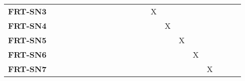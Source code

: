 \documentclass[12pt, titlepage]{article}
\begin{document}
\begin{landscape}
\begin{longtable}{|l|cccccccccccccccc|}
		\textbf{FRT-SN3} & ~                                                         & ~             & ~             & ~             & ~             & ~             & ~             & ~             & X             & ~             & ~             & ~             & ~             \\
		\textbf{FRT-SN4} & ~                                                         & ~             & ~             & ~             & ~             & ~             & ~             & ~             & ~             & X             & ~             & ~             & ~             \\
		\textbf{FRT-SN5} & ~                                                         & ~             & ~             & ~             & ~             & ~             & ~             & ~             & ~             & ~             & X             & ~             & ~             \\
		\textbf{FRT-SN6} & ~                                                         & ~             & ~             & ~             & ~             & ~             & ~             & ~             & ~             & ~             & ~             & X             & ~             \\
		\textbf{FRT-SN7} & ~                                                         & ~             & ~             & ~             & ~             & ~             & ~             & ~             & ~             & ~             & ~             & ~             & X             \\
		\hline
	\end{longtable}


\end{landscape}
\end{document}
